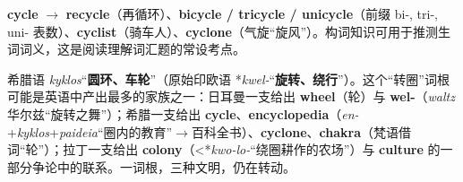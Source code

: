 \documentclass[../main.tex]{subfiles}
\begin{document}




\begin{gram}[-cycle 词族]
\textbf{cycle} $\to$ \textbf{recycle}（再循环）、\textbf{bicycle / tricycle / unicycle}（前缀 bi-, tri-, uni- 表数）、\textbf{cyclist}（骑车人）、\textbf{cyclone}（气旋“旋风”）。构词知识可用于推测生词词义，这是阅读理解词汇题的常设考点。
\end{gram}

\begin{origin}
希腊语 \textit{kyklos}“\textbf{圆环、车轮}”（原始印欧语 *\textit{kwel-}“\textbf{旋转、绕行}”）。这个“转圈”词根可能是英语中产出最多的家族之一：日耳曼一支给出 \textbf{wheel}（轮）与 \textbf{wel-}（\textit{waltz} 华尔兹“旋转之舞”）；希腊一支给出 \textbf{cycle}、\textbf{encyclopedia}（\textit{en-}+\textit{kyklos}+\textit{paideia}“圈内的教育”$\to$百科全书）、\textbf{cyclone}、\textbf{chakra}（梵语借词“轮”）；拉丁一支给出 \textbf{colony}（<*\textit{kwo-lo-}“绕圈耕作的农场”）与 \textbf{culture} 的一部分争论中的联系。一词根，三种文明，仍在转动。
\end{origin}
\end{document}
